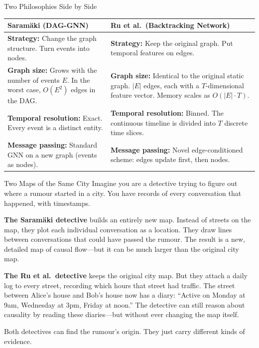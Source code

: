 \begin{conceptbox}{Two Philosophies Side by Side}
\begin{center}
\begin{tabular}{p{} p{}}
\toprule
\textbf{Saram{\"a}ki (DAG-GNN)} & \textbf{Ru et al.\ (Backtracking Network)} \\
\midrule
\textbf{Strategy:} Change the graph structure. Turn events into nodes. &
\textbf{Strategy:} Keep the original graph. Put temporal features on edges. \\[4pt]

\textbf{Graph size:} Grows with the number of events $E$. In the worst case, $O(E^2)$ edges in the DAG. &
\textbf{Graph size:} Identical to the original static graph. $|E|$ edges, each with a $T$-dimensional feature vector. Memory scales as $O(|E| \cdot T)$. \\[4pt]

\textbf{Temporal resolution:} Exact. Every event is a distinct entity. &
\textbf{Temporal resolution:} Binned. The continuous timeline is divided into $T$ discrete time slices. \\[4pt]

\textbf{Message passing:} Standard GNN on a new graph (events as nodes). &
\textbf{Message passing:} Novel edge-conditioned scheme: edges update first, then nodes. \\
\bottomrule
\end{tabular}
\end{center}
\end{conceptbox}

\begin{analogybox}{Two Maps of the Same City}
Imagine you are a detective trying to figure out where a rumour started in a city. You have records of every conversation that happened, with timestamps.

\textbf{The Saram{\"a}ki detective} builds an entirely new map. Instead of streets on the map, they plot each individual conversation as a location. They draw lines between conversations that could have passed the rumour. The result is a new, detailed map of causal flow---but it can be much larger than the original city map.

\textbf{The Ru et al.\ detective} keeps the original city map. But they attach a daily log to every street, recording which hours that street had traffic. The street between Alice's house and Bob's house now has a diary: ``Active on Monday at 9am, Wednesday at 3pm, Friday at noon.'' The detective can still reason about causality by reading these diaries---but without ever changing the map itself.

Both detectives can find the rumour's origin. They just carry different kinds of evidence.
\end{analogybox}

